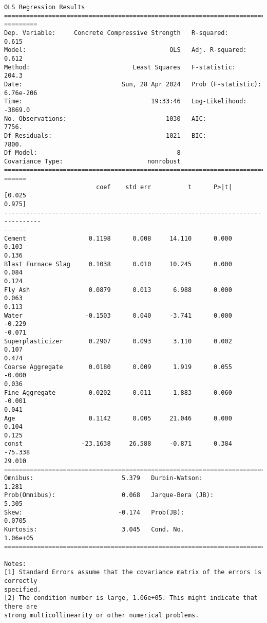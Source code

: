 \documentclass[11pt]{article}
\begin{document}
    \begin{Verbatim}[commandchars=\\\{\}]
                                  OLS Regression Results
================================================================================
=========
Dep. Variable:     Concrete Compressive Strength   R-squared:
0.615
Model:                                       OLS   Adj. R-squared:
0.612
Method:                            Least Squares   F-statistic:
204.3
Date:                           Sun, 28 Apr 2024   Prob (F-statistic):
6.76e-206
Time:                                   19:33:46   Log-Likelihood:
-3869.0
No. Observations:                           1030   AIC:
7756.
Df Residuals:                               1021   BIC:
7800.
Df Model:                                      8
Covariance Type:                       nonrobust
================================================================================
======
                         coef    std err          t      P>|t|      [0.025
0.975]
--------------------------------------------------------------------------------
------
Cement                 0.1198      0.008     14.110      0.000       0.103
0.136
Blast Furnace Slag     0.1038      0.010     10.245      0.000       0.084
0.124
Fly Ash                0.0879      0.013      6.988      0.000       0.063
0.113
Water                 -0.1503      0.040     -3.741      0.000      -0.229
-0.071
Superplasticizer       0.2907      0.093      3.110      0.002       0.107
0.474
Coarse Aggregate       0.0180      0.009      1.919      0.055      -0.000
0.036
Fine Aggregate         0.0202      0.011      1.883      0.060      -0.001
0.041
Age                    0.1142      0.005     21.046      0.000       0.104
0.125
const                -23.1638     26.588     -0.871      0.384     -75.338
29.010
==============================================================================
Omnibus:                        5.379   Durbin-Watson:                   1.281
Prob(Omnibus):                  0.068   Jarque-Bera (JB):                5.305
Skew:                          -0.174   Prob(JB):                       0.0705
Kurtosis:                       3.045   Cond. No.                     1.06e+05
==============================================================================

Notes:
[1] Standard Errors assume that the covariance matrix of the errors is correctly
specified.
[2] The condition number is large, 1.06e+05. This might indicate that there are
strong multicollinearity or other numerical problems.
    \end{Verbatim}
\end{document}
